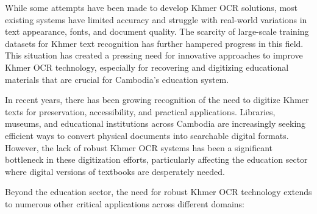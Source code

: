 While some attempts have been made to develop Khmer OCR solutions, most existing systems have limited accuracy and struggle with real-world variations in text appearance, fonts, and document quality. The scarcity of large-scale training datasets for Khmer text recognition has further hampered progress in this field. This situation has created a pressing need for innovative approaches to improve Khmer OCR technology, especially for recovering and digitizing educational materials that are crucial for Cambodia's education system.

In recent years, there has been growing recognition of the need to digitize Khmer texts for preservation, accessibility, and practical applications. Libraries, museums, and educational institutions across Cambodia are increasingly seeking efficient ways to convert physical documents into searchable digital formats. However, the lack of robust Khmer OCR systems has been a significant bottleneck in these digitization efforts, particularly affecting the education sector where digital versions of textbooks are desperately needed.

\begin{table}[ht]
    \caption{Current State of Khmer Textbook Digitization in Cambodia's Education System}
    \vspace{10pt}
    \label{sec:textbook}
    \end{table}


Beyond the education sector, the need for robust Khmer OCR technology extends to numerous other critical applications across different domains:

